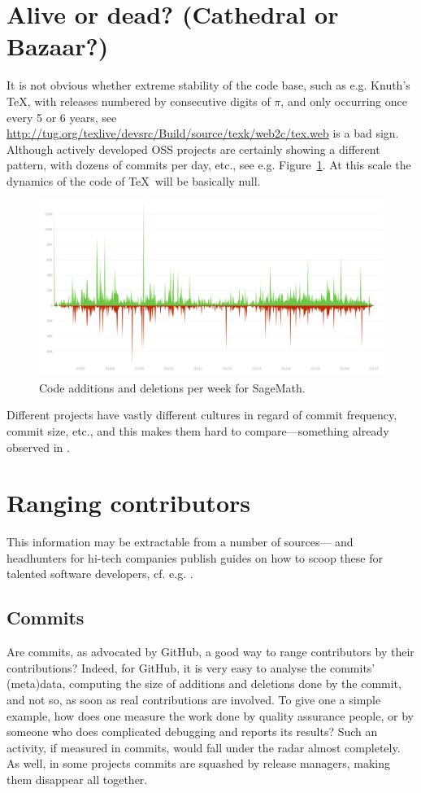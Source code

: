 \documentclass{deliverablereport}
\begin{document}
\section{Alive or dead? (Cathedral or Bazaar?)}
It is not obvious whether extreme stability of the code base,
such as e.g. Knuth's \TeX \cite{Knuth:ttb84}, with releases
numbered by consecutive digits of $\pi$, and only occurring
once every 5 or 6 years, see
\url{http://tug.org/texlive/devsrc/Build/source/texk/web2c/tex.web}
is a bad sign.
Although actively developed OSS projects are certainly showing 
a different pattern, with dozens of commits per day, etc., see
e.g. Figure~\ref{wp7:figsageadddel}. At this scale the dynamics of
the code of \TeX\ will be basically null.
\begin{figure}[ht]
  \includegraphics[width=\textwidth]{codeadddel}
    \caption{Code additions and deletions per week for 
    SageMath.\label{wp7:figsageadddel}}
\end{figure}
Different projects have vastly different cultures in regard of
commit frequency, commit size, etc., and this makes them 
hard to compare---something already observed in 
 \cite{raymond99:cathedral-bazaar}. 


\section{Ranging contributors}
This information may be extractable from a number of sources---
and headhunters for hi-tech companies publish guides on
how to scoop these for talented software developers, cf.
e.g. \cite{wp7:sota}.

\subsection{Commits}
Are commits, as advocated by GitHub, a good way to range contributors by their
contributions? Indeed, for GitHub, it is very easy to analyse the commits' (meta)data, computing the size of additions and deletions done by the commit,
and not so, as soon as real contributions are involved. To give one a simple example, how does
one measure the work done by quality assurance people, or by someone who does complicated debugging
and reports its results? Such an activity, if measured in commits, would fall under the radar almost
completely. As well, in some projects commits are squashed by release
managers, making them disappear all together.
\end{document}

